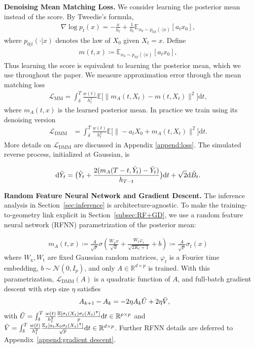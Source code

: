 \documentclass[11pt]{article}
\newcommand{\mb}{\mathbb}
\newcommand{\dee}{\mathrm{d}}
\newcommand{\mc}{\mathcal}
\newcommand{\DMM}{\mc{L}_{\mathrm{DMM}}}
\newcommand{\MM}{\mc{L}_{\mathrm{MM}}}
\newcommand{\Wx}{W_{\mathrm{x}}}
\newcommand{\Wt}{W_{\mathrm{t}}}
\begin{document}
\noindent\textbf{Denoising Mean Matching Loss.} We consider learning the posterior mean instead of the score. By Tweedie’s formula,
\begin{align}
    \nabla \log p_t(x) = - \frac{x}{h_t} + \frac{1}{h_t}\mb{E}_{x_0\sim p_{0|t}(\cdot|x)}[a_t x_0],
    \label{eq:score}
\end{align}
where $p_{0|t}(\cdot|x)$ denotes the law of $X_0$ given $X_t=x$. Define
\begin{align}
    m(t,x)\coloneqq \mb{E}_{x_0\sim p_{0|t}(\cdot|x)}[a_t x_0],
    \label{eq:posterior mean}
\end{align}
Thus learning the score is equivalent to learning the posterior mean, which we use throughout the paper. We measure approximation error through the mean matching loss
\begin{align}\label{eq:mean matching loss}
    \MM=\int_\delta^{T} \frac{w(t)}{h_t^2} \mb{E} \big[  \|  m_A(t,X_t) - m(t,X_t) \|^2 \big] \dee t,
\end{align}
where $m_A(t,x)$ is the learned posterior mean. In practice we train using its denoising version
\begin{align}\label{eq:DMM}
    \DMM & = \int_\delta^{T} \frac{w(t)}{h_t^2} \mb{E} \big[  \| -a_t X_0+ m_A(t,X_t) \|^2 \big] \dee t.
\end{align}
More details on $\DMM$ are discussed in Appendix \ref{append:loss}. The simulated reverse process, initialized at Gaussian, is 

\begin{align}\label{eq:BD approximate}
    \dee \Tilde{Y}_t = \big(  \Tilde{Y}_t + \frac{2(m_A(T-t,\Tilde{Y}_t)-\Tilde{Y}_t)}{h_{T-t}} \big) \dee t +\sqrt{2}\dee \Tilde{B}_t.
\end{align}

\noindent\textbf{Random Feature Neural Network and Gradient Descent.} The inference analysis in Section~\ref{sec:inference} is architecture-agnostic. To make the training-to-geometry link explicit in Section~\ref{subsec:RF+GD}, we use a random feature neural network (RFNN) parametrization of the posterior mean:

\begin{align*}
   m_A(t,x) \coloneqq \frac{A}{\sqrt{p}} \sigma (\frac{\Wx x}{\sqrt{d}}   + \frac{\Wt \varphi_t}{\sqrt{2K_t+1}} + b )\coloneqq \frac{A}{\sqrt{p}}\sigma_t(x) 
\end{align*}
where $\Wx,\Wt$ are fixed Gaussian random matrices, $\varphi_t$ is a Fourier time embedding, $b\sim \mc N(0,I_p)$, and only $A\in\mb R^{d\times p}$ is trained. With this parametrization, $\DMM(A)$ is a quadratic function of $A$, and full-batch gradient descent with step size $\eta$ satisfies
\vspace{-.15cm}
\begin{align}\label{eq:gd}
     A_{k+1} - A_k = -{2\eta} A_k \Tilde{U} & + {2\eta}\Tilde{V},  
\end{align}
with $\Tilde{U}  = \int_\delta^T \frac{w(t)}{h_t^2} \frac{\mb{E}[ \sigma_t(X_t)\sigma_t(X_t)^\intercal ]}{p}\dee t \in \mb{R}^{p\times p}$ and $\Tilde{V}  = \int_\delta^T \frac{w(t)}{h_t^2}\frac{\mb{E}_z [ a_t X_0 \sigma_t(X_t)^\intercal ]}{\sqrt{p}}\dee t \in \mb{R}^{d\times p}$. Further RFNN details are deferred to Appendix~\ref{append:gradient descent}.
\end{document}
